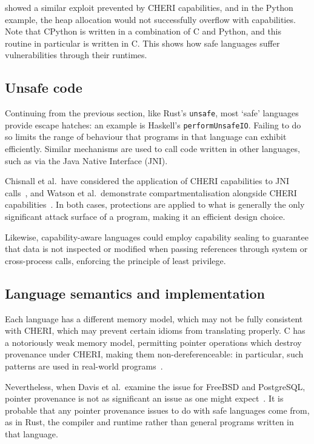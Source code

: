\documentclass[dissertation.tex]{subfiles}
\begin{document}
 showed a similar exploit prevented by CHERI
capabilities, and in the Python example, the heap allocation would not
successfully overflow with capabilities.
Note that CPython is written in a combination of C and Python, and this
routine in particular is written in C.
This shows how safe languages suffer vulnerabilities through their
runtimes.


\subsection{Unsafe code}
Continuing from the previous section, like Rust's \texttt{unsafe}, most
`safe' languages provide escape hatches: an example is Haskell's
\texttt{performUnsafeIO}.
Failing to do so limits the range of behaviour that programs in that
language can exhibit efficiently.
Similar mechanisms are used to call code written in other languages,
such as via the Java Native Interface (JNI).

Chisnall et al.\ have considered the application of CHERI capabilities
to JNI calls~\cite{cheri-jni}, and Watson et al.\ demonstrate
compartmentalisation alongside CHERI capabilities~\cite{cheri2015}.
In both cases, protections are applied to what is generally the only
significant attack surface of a program, making it an efficient design
choice.

Likewise, capability-aware languages could employ capability sealing to
guarantee that data is not inspected or modified when passing references
through system or cross-process calls, enforcing the principle of least
privilege.


\subsection{Language semantics and implementation}
Each language has a different memory model, which may not be fully
consistent with CHERI, which may prevent certain idioms from translating
properly.
C has a notoriously weak memory model, permitting pointer operations
which destroy provenance under CHERI, making them non-dereferenceable:
in particular, such patterns are used in real-world
programs~\cite{memarian2016cdepths}.

Nevertheless, when Davis et al.\ examine the issue for FreeBSD and
PostgreSQL, pointer provenance is not as significant an issue as one
might expect~\cite{cheri-2019-abstract}.
It is probable that any pointer provenance issues to do with safe
languages come from, as in Rust, the compiler and runtime rather than
general programs written in that language.
\end{document}
